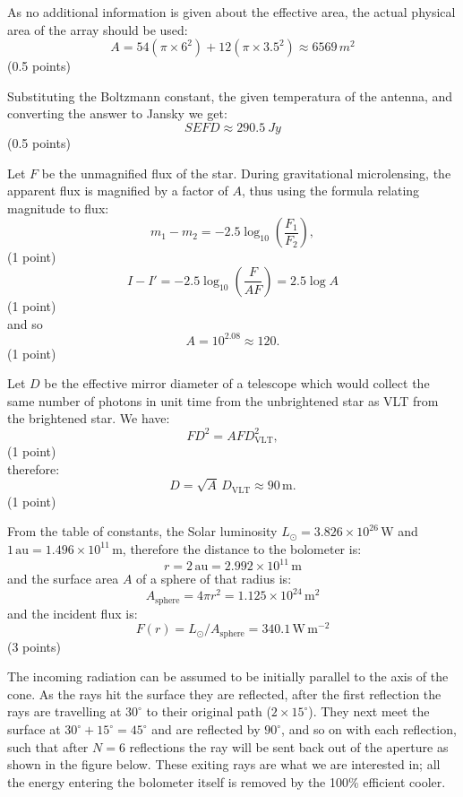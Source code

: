 \begin{description}
As no additional information is given about the effective area, the actual
physical area of the array should be used:
\[ A = 54\left(\pi \times 6^2\right) + 12\left(\pi \times 3.5^2\right)
   \approx 6569\,m^2 \]
\hfill(0.5 points)

Substituting the Boltzmann constant, the given temperatura of the antenna,
and converting the answer to Jansky we get:
\[ SEFD \approx 290.5~Jy \]
\hfill(0.5 points)
\end{description}

Let $F$ be the unmagnified flux of the star. During gravitational
microlensing, the apparent flux is magnified by a factor of $A$, thus using
the formula relating magnitude to flux:
\[ m_1 - m_2 = -2.5\log_{10}\left(\frac{F_1}{F_2}\right), \]
\hfill(1 point)
\[ I - I' = -2.5\log_{10}\left(\frac{F}{AF}\right) = 2.5\log A \]
\hfill(1 point)\\
and so
\[ A = 10^{2.08} \approx 120. \]
\hfill(1 point)

Let $D$ be the effective mirror diameter of a telescope which would collect
the same number of photons in unit time from the unbrightened star as VLT
from the brightened star. We have:
\[ FD^2 = AFD_{\mathrm{VLT}}^2, \]
\hfill(1 point)\\
therefore:
\[ D = \sqrt{A}\,D_{\mathrm{VLT}} \approx 90\,\mathrm{m}. \]
\hfill(1 point)

From the table of constants, the Solar luminosity
$L_\odot = 3.826 \times 10^{26}$\,W and
$1\,\mathrm{au} = 1.496 \times 10^{11}$\,m, therefore the distance to the
bolometer is:
\[ r = 2\,\mathrm{au} = 2.992 \times 10^{11}\,\mathrm{m} \]
and the surface area $A$ of a sphere of that radius is:
\[ A_{\mathrm{sphere}} = 4\pi r^2 = 1.125 \times 10^{24}\,\mathrm{m}^2 \]
and the incident flux is:
\[ F(r) = L_\odot/A_{\mathrm{sphere}} = 340.1\,\mathrm{W\,m^{-2}} \]
\hfill(3 points)

The incoming radiation can be assumed to be initially parallel to the axis of
the cone. As the rays hit the surface they are reflected, after the first
reflection the rays are travelling at $30^\circ$ to their original path
($2 \times 15^\circ$). They next meet the surface at
$30^\circ + 15^\circ = 45^\circ$ and are reflected by $90^\circ$, and so on
with each reflection, such that after $N = 6$ reflections the ray will be
sent back out of the aperture as shown in the figure below. These exiting
rays are what we are interested in; all the energy entering the bolometer
itself is removed by the 100\% efficient cooler.

